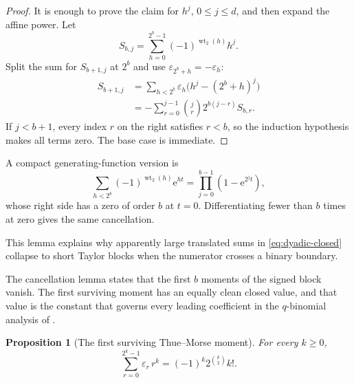 \documentclass[11pt,oneside]{article}
\newtheorem{proposition}[theorem]{Proposition}
\theoremstyle{definition}
\theoremstyle{remark}
\newcommand{\wt}{\operatorname{wt}_2}
\newcommand{\e}{\mathrm e}
\begin{document}
\begin{proof}
It is enough to prove the claim for $h^j$, $0\le j\le d$, and then expand the affine power.
Let
\begin{equation*}
 S_{b,j}=\sum_{h=0}^{2^b-1}(-1)^{\wt(h)}h^j.
\end{equation*}
Split the sum for $S_{b+1,j}$ at $2^b$ and use
$\varepsilon_{2^b+h}=-\varepsilon_h$:
\begin{align*}
 S_{b+1,j}
 &=\sum_{h<2^b}\varepsilon_h\bigl(h^j-(2^b+h)^j\bigr)\\
 &=-\sum_{r=0}^{j-1}\binom jr2^{b(j-r)}S_{b,r}.
\end{align*}
If $j<b+1$, every index $r$ on the right satisfies $r<b$, so the induction hypothesis makes
all terms zero.  The base case is immediate.
\end{proof}

A compact generating-function version is
\begin{equation}
 \sum_{h<2^b}(-1)^{\wt(h)}\e^{ht}
 =\prod_{j=0}^{b-1}(1-\e^{2^jt}),                          \label{eq:thue-exponential-product}
\end{equation}
whose right side has a zero of order $b$ at $t=0$.  Differentiating fewer than $b$ times at
zero gives the same cancellation.

This lemma explains why apparently large translated sums in \eqref{eq:dyadic-closed} collapse
to short Taylor blocks when the numerator crosses a binary boundary.


The cancellation lemma states that the first $b$ moments of the signed block vanish.  The
first surviving moment has an equally clean closed value, and that value is the constant
that governs every leading coefficient in the $q$-binomial analysis of
.

\begin{proposition}[The first surviving Thue--Morse moment]
\label{prop:dy-tm-moment}
For every $k\ge0$,
\begin{equation}
\boxed{
 \sum_{r=0}^{2^k-1}\varepsilon_r\,r^k=(-1)^k2^{\binom k2}k!.}
                                                               \label{eq:dy-tm-moment}
\end{equation}
\end{proposition}
\end{document}

